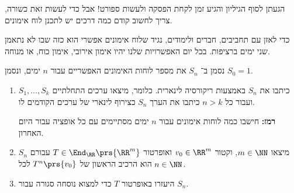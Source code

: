 \documentclass[a4paper,10pt,twoside,openany]{article}
\begin{document}
\begin{exercise}
הגעתן לסוף הגיליון והגיע זמן לקחת הפסקה ולעשות ספורט! אבל כדי לעשות זאת כשורה, צריך לחשוב קודם כמה דרכים יש לתכנן לוח אימונים.

כדי לאזן עם תחביבים, חברים ולימודים, נגיד שלוח אימונים אפשרי הוא כזה שבו לא נתאמן שני ימים ברציפות. בכל יום האפשרויות שלנו יהיו אימון אירובי, אימון כוח, או מנוחה.

 נסמן ב־%
$S_n$
את מספר לוחות האימונים האפשריים עבור
$n$
ימים, ונסמן
$S_0 = 1$.

\begin{enumerate}
\item כיתבו את
$S_n$
באמצעות ריקורסיה לינארית. כלומר, מיצאו ערכים התחלתיים
$S_1, \ldots, S_k$
ועבור כל
$n > k$
כיתבו את הערך
$S_n$
כצירוף לינארי של ערכים הקודמים לו.

\textbf{רמז:}
חישבו כמה לוחות אימונים עבור
$n$
ימים מסתיימים עם כל אופציה עבור היום האחרון.

\item
מיצאו $m \in \NN$,
וקטור
$v_0 \in \RR^m$
ואופרטור
$T \in \End_\RR\prs{\RR^m}$
עבורם
$S_n$
הוא הרכיב הראשון של
$T^n \prs{v_0}$
לכל
$n \in \NN$.

\item
היעזרו באופרטור
$T$
כדי למצוא נוסחה סגורה עבור
$S_n$.
\end{enumerate}

\end{exercise}
\end{document}
